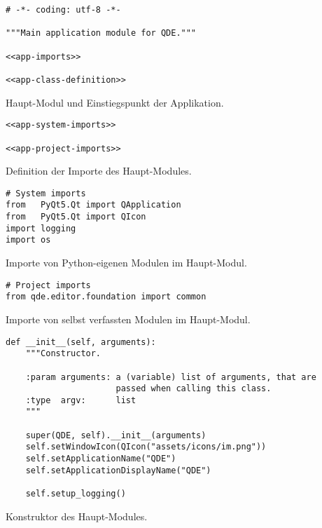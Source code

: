 \documentclass[10pt, openright, notitlepage]{scrreprt}
\begin{document}
\begin{listing}[H]
\begin{verbatim}
# -*- coding: utf-8 -*-

"""Main application module for QDE."""

<<app-imports>>

<<app-class-definition>>
\end{verbatim}
\caption{Haupt-Modul und Einstiegspunkt der Applikation.}
\end{listing}

\begin{listing}[H]
\begin{verbatim}
<<app-system-imports>>

<<app-project-imports>>
\end{verbatim}
\caption{\label{org748c809}
Definition der Importe des Haupt-Modules.}
\end{listing}

\begin{listing}[H]
\begin{verbatim}
# System imports
from   PyQt5.Qt import QApplication
from   PyQt5.Qt import QIcon
import logging
import os
\end{verbatim}
\caption{\label{org5504ab0}
Importe von Python-eigenen Modulen im Haupt-Modul.}
\end{listing}

\begin{listing}[H]
\begin{verbatim}
# Project imports
from qde.editor.foundation import common
\end{verbatim}
\caption{\label{org5e6eeed}
Importe von selbst verfassten Modulen im Haupt-Modul.}
\end{listing}

\begin{listing}[H]
\begin{verbatim}
def __init__(self, arguments):
    """Constructor.

    :param arguments: a (variable) list of arguments, that are
                      passed when calling this class.
    :type  argv:      list
    """

    super(QDE, self).__init__(arguments)
    self.setWindowIcon(QIcon("assets/icons/im.png"))
    self.setApplicationName("QDE")
    self.setApplicationDisplayName("QDE")

    self.setup_logging()
\end{verbatim}
\caption{\label{org7702788}
Konstruktor des Haupt-Modules.}
\end{listing}
\end{document}
